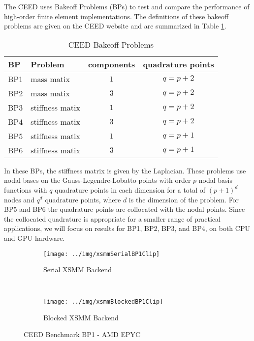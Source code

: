The CEED uses Bakeoff Problems (BPs) to test and compare the performance of high-order finite element implementations.
The definitions of these bakeoff problems are given on the CEED website \cite{ceed-bps} and are summarized in Table \ref{table:ceedbps}.

\begin{table}[ht!]
\begin{center}
\begin{tabular}{l l c c}
  \toprule
  BP  & Problem         & components & quadrature points  \\
  \toprule
  BP1 & mass matix      & $1$        & $q = p + 2$        \\
  BP2 & mass matix      & $3$        & $q = p + 2$        \\
  \midrule
  BP3 & stiffness matix & $1$        & $q = p + 2$        \\
  BP4 & stiffness matix & $3$        & $q = p + 2$        \\
  \midrule
  BP5 & stiffness matix & $1$        & $q = p + 1$        \\
  BP6 & stiffness matix & $3$        & $q = p + 1$        \\
  \bottomrule
\end{tabular}
\end{center}
\caption{CEED Bakeoff Problems}
\label{table:ceedbps}
\end{table}

In these BPs, the stiffness matrix is given by the Laplacian.
These problems use nodal bases on the Gauss-Legendre-Lobatto points with order $p$ nodal basis functions with $q$ quadrature points in each dimension for a total of $\left( p + 1 \right)^d$ nodes and $q^d$ quadrature points, where $d$ is the dimension of the problem.
For BP5 and BP6 the quadrature points are collocated with the nodal points.
Since the collocated quadrature is appropriate for a smaller range of practical applications, we will focus on results for BP1, BP2, BP3, and BP4, on both CPU and GPU hardware.

\begin{figure}[ht!]
\begin{subfigure}{.99\textwidth}
\texttt{[image: ../img/xsmmSerialBP1Clip]}
\caption{Serial XSMM Backend}
\end{subfigure}\\
\begin{subfigure}{.99\textwidth}
\texttt{[image: ../img/xsmmBlockedBP1Clip]}
\caption{Blocked XSMM Backend}
\end{subfigure}
\caption{CEED Benchmark BP1 - AMD EPYC}
\label{fig:cpu-bp1}
\end{figure}

